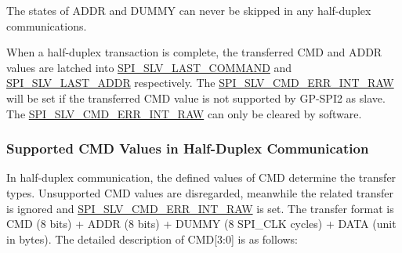 \documentclass[main\_\_EN.tex]{subfiles}
\begin{document}
\begin{tiplisting}
The states of ADDR and DUMMY can never be skipped in any half-duplex communications.
\end{tiplisting}
\vspace{-1em}
When a half-duplex transaction is complete, the transferred CMD and ADDR values are latched into \hyperref[fielddesc:SPISLVLASTCOMMAND]{SPI\_SLV\_LAST\_COMMAND} and \hyperref[fielddesc:SPISLVLASTADDR]{SPI\_SLV\_LAST\_ADDR} respectively. The \hyperref[fielddesc:SPISLVCMDERRINTRAW]{SPI\_SLV\_CMD\_ERR\_INT\_RAW} will be set if the transferred CMD value is not supported by GP-SPI2 as slave. The \hyperref[fielddesc:SPISLVCMDERRINTRAW]{SPI\_SLV\_CMD\_ERR\_INT\_RAW} can only be cleared by software.

\subsubsection{Supported CMD Values in Half-Duplex Communication} \label{GP-SPI2 HD salve format}  

In half-duplex communication, the defined values of CMD determine the transfer types. Unsupported CMD values are disregarded, meanwhile the related transfer is ignored and \hyperref[fielddesc:SPISLVCMDERRINTRAW]{SPI\_SLV\_CMD\_ERR\_INT\_RAW} is set. The transfer format is CMD (8 bits) + ADDR (8 bits) + DUMMY (8 SPI\_CLK cycles) + DATA (unit in bytes). The detailed description of CMD[3:0] is as follows:
\end{document}
